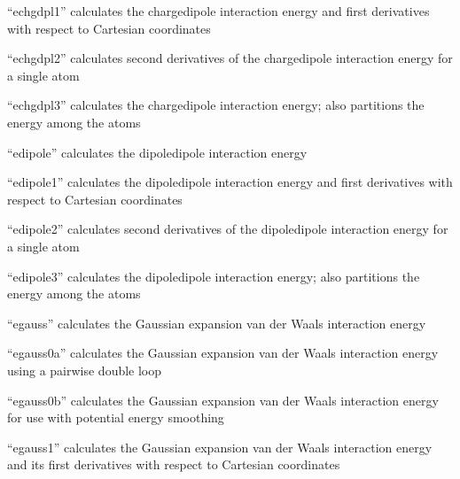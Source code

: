 \documentclass[letterpaper,11pt,english]{sphinxmanual}
\begin{document}

“echgdpl1” calculates the charge\sphinxhyphen{}dipole interaction energy and first derivatives with respect to Cartesian coordinates


“echgdpl2” calculates second derivatives of the charge\sphinxhyphen{}dipole interaction energy for a single atom


“echgdpl3” calculates the charge\sphinxhyphen{}dipole interaction energy; also partitions the energy among the atoms


“edipole” calculates the dipole\sphinxhyphen{}dipole interaction energy


“edipole1” calculates the dipole\sphinxhyphen{}dipole interaction energy and first derivatives with respect to Cartesian coordinates


“edipole2” calculates second derivatives of the dipole\sphinxhyphen{}dipole interaction energy for a single atom


“edipole3” calculates the dipole\sphinxhyphen{}dipole interaction energy; also partitions the energy among the atoms


“egauss” calculates the Gaussian expansion van der Waals interaction energy


“egauss0a” calculates the Gaussian expansion van der Waals interaction energy using a pairwise double loop


“egauss0b” calculates the Gaussian expansion van der Waals interaction energy for use with potential energy smoothing


“egauss1” calculates the Gaussian expansion van der Waals interaction energy and its first derivatives with respect to Cartesian coordinates

\end{document}
